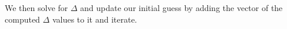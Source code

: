 We then solve  for $\Delta$ and update our initial
guess by adding the vector of the computed $\Delta$ values to it and iterate.
